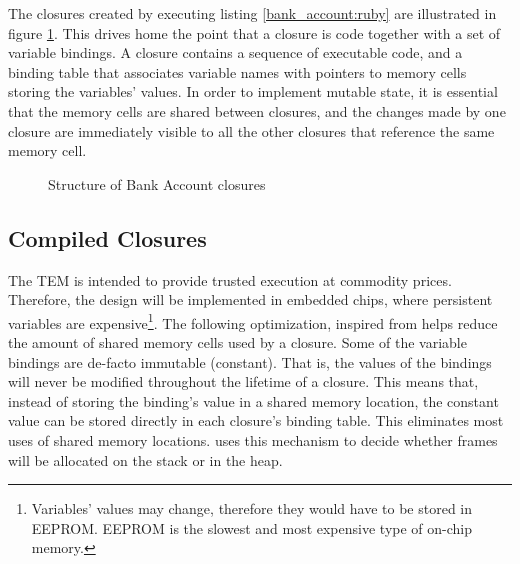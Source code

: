 

The closures created by executing listing \ref{bank_account:ruby} are
illustrated in figure \ref{fig:bank_account}. This drives home the point that a
closure is code together with a set of variable bindings. A closure contains
a sequence of executable code, and a binding table that associates variable
names with pointers to memory cells storing the variables' values. In order to
implement mutable state, it is essential that the memory cells are shared
between closures, and the changes made by one closure are immediately visible
to all the other closures that reference the same memory cell.

\begin{figure}[hbtp]
	\caption{Structure of Bank Account closures}
	\label{fig:bank_account}
\end{figure}

\subsection{Compiled Closures}\label{concepts:compiled_closures}
The TEM is intended to provide trusted execution at commodity prices.
Therefore, the design will be implemented in embedded chips, where persistent
variables are expensive\footnote{Variables' values may change, therefore they would have to be
stored in EEPROM. EEPROM is the slowest and most expensive type of on-chip
memory.}. The following optimization, inspired from \cite{Ste:78b} helps
reduce the amount of shared memory cells used by a closure. Some of the
variable bindings are de-facto immutable (constant). That is, the values of the
bindings will never be modified throughout the lifetime of a closure. This
means that, instead of storing the binding's value in a shared memory location,
the constant value can be stored directly in each closure's binding table. This
eliminates most uses of shared memory locations. \cite{Ste:78b} uses this
mechanism to decide whether frames will be allocated on the stack or in the
heap.

